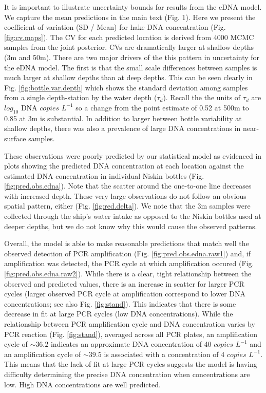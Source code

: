 \documentclass[
]{article}
\begin{document}
It is important to illustrate uncertainty bounds for results from the
eDNA model. We capture the mean predictions in the main text (Fig. 1).
Here we present the coefficient of variation (SD / Mean) for hake DNA
concentration (Fig. \ref{fig:cv.maps}). The CV for each predicted
location is derived from 4000 MCMC samples from the joint posterior. CVs
are dramatically larger at shallow depths (3m and 50m). There are two
major drivers of the this pattern in uncertainty for the eDNA model. The
first is that the small scale differences between samples is much larger
at shallow depths than at deep depths. This can be seen clearly in Fig.
\ref{fig:bottle.var.depth} which shows the standard deviation among
samples from a single depth-station by the water depth (\(\tau_d\)).
Recall the the units of \(\tau_d\) are \(log_{10}\) DNA \(copies\)
\(L^{-1}\) so a change from the point estimate of 0.52 at 500m to 0.85
at 3m is substantial. In addition to larger between bottle variability
at shallow depths, there was also a prevalence of large DNA
concentrations in near-surface samples.

These observations were poorly predicted by our statistical model as
evidenced in plots showing the predicted DNA concentration at each
location against the estimated DNA concentration in individual Niskin
bottles (Fig. \ref{fig:pred.obs.edna}). Note that the scatter around the
one-to-one line decreases with increased depth. These very large
observations do not follow an obvious spatial pattern, either (Fig.
\ref{fig:red.delta}). We note that the 3m samples were collected through
the ship's water intake as opposed to the Niskin bottles used at deeper
depths, but we do not know why this would cause the observed patterns.

Overall, the model is able to make reasonable predictions that match
well the observed detection of PCR amplification (Fig.
\ref{fig:pred.obs.edna.raw1}) and, if amplification was detected, the
PCR cycle at which amplification occured (Fig.
\ref{fig:pred.obs.edna.raw2}). While there is a clear, tight
relationship between the observed and predicted values, there is an
increase in scatter for larger PCR cycles (larger observed PCR cycle at
amplification correspond to lower DNA concentrations; see also Fig.
\ref{fig:stand}). This indicates that there is some decrease in fit at
large PCR cycles (low DNA concentrations). While the relationship
between PCR amplification cycle and DNA concentration varies by PCR
reaction (Fig. \ref{fig:stand}), averaged across all PCR plates, an
amplification cycle of \(\sim 36.2\) indicates an approximate DNA
concentration of 40 \(copies\) \(L^{-1}\) and an amplification cycle of
\(\sim 39.5\) is associated with a concentration of 4 \(copies\)
\(L^{-1}\). This means that the lack of fit at large PCR cycles suggests
the model is having difficulty determining the precise DNA concentration
when concentrations are low. High DNA concentrations are well predicted.
\end{document}

